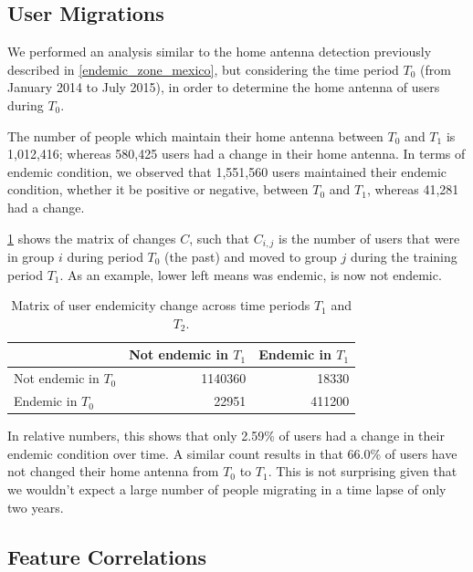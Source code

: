 


\subsection{User Migrations}\label{subsection:user_migrations} %

We performed an analysis similar to the home antenna detection previously described in \cref{endemic_zone_mexico}, but considering the time period $T_0$ (from January 2014 to July 2015), in order to determine the home antenna of users during $T_0$.

The number of people which maintain their home antenna between $T_0$ and $T_1$ is 1,012,416; whereas 580,425 users had a change in their home antenna.
In terms of endemic condition, we observed that 1,551,560 users maintained their endemic condition, whether it be positive or negative, between $T_0$ and $T_1$, whereas 41,281 had a change.


\cref{tab:changes} shows the matrix of changes $C$, such that $C_{i, j}$ is the number of users that were in group $i$ during period $T_0$ (the past) and moved to group $j$ during the training period $T_1$.
As an example, lower left means was endemic, is now not endemic.

\begin{table}[ht]
	\caption{Matrix of user endemicity change across time periods $T_1$ and $T_2$.}\label{tab:changes}
	\centering
	\begin{tabular}{l r r }
		\toprule
		& Not endemic in $T_1$ & Endemic in $T_1$ \\
		\midrule
		Not endemic in $T_0$ & 1140360 & 18330   \\
		Endemic in $T_0$       & 22951    & 411200 \\
		\bottomrule
	\end{tabular}
\end{table}

In relative numbers, this shows that only 2.59\% of users had a change in their endemic condition over time.
A similar count results in that 66.0\% of users have not changed their home antenna from $T_0$ to $T_1$.
This is not surprising given that we wouldn't expect a large number of people migrating in a time lapse of only two years.


\subsection{Feature Correlations}
\label{subsection:feature_correlations} %



